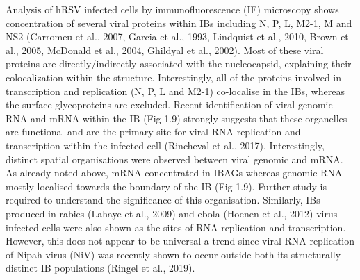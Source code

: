 Analysis of hRSV infected cells by immunofluorescence (IF) microscopy shows concentration of several viral proteins within IBs including N, P, L, M2-1, M and NS2 (Carromeu et al., 2007, Garcia et al., 1993, Lindquist et al., 2010, Brown et al., 2005, McDonald et al., 2004, Ghildyal et al., 2002). Most of these viral proteins are directly/indirectly associated with the nucleocapsid, explaining their colocalization within the structure. Interestingly, all of the proteins involved in transcription and replication (N, P, L and M2-1) co-localise in the IBs, whereas the surface glycoproteins are excluded. Recent identification of viral genomic RNA and mRNA within the IB (Fig 1.9) strongly suggests that these organelles are functional and are the primary site for viral RNA replication and transcription within the infected cell (Rincheval et al., 2017). Interestingly, distinct spatial organisations were observed between viral genomic and mRNA. As already noted above, mRNA concentrated in IBAGs whereas genomic RNA mostly localised towards the boundary of the IB (Fig 1.9). Further study is required to understand the significance of this organisation. Similarly, IBs produced in rabies (Lahaye et al., 2009) and ebola (Hoenen et al., 2012) virus infected cells were also shown as the sites of RNA replication and transcription. However, this does not appear to be universal a trend since viral RNA replication of Nipah virus (NiV) was recently shown to occur outside both its structurally distinct IB populations (Ringel et al., 2019).

